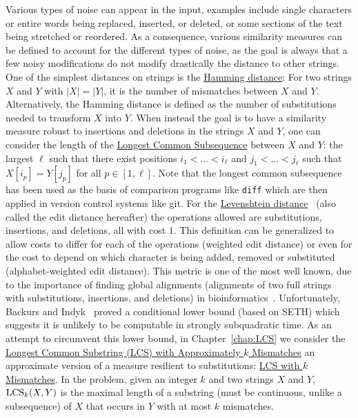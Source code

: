 Various types of noise can appear in the input, examples include single characters or entire words being replaced, inserted, or deleted, or some sections of the text being stretched or reordered. As a consequence, various similarity measures can be defined to account for the different types of noise, as the goal is always that a few noisy modifications do not modify drastically the distance to other strings.
One of the simplest distances on strings is the \underline{Hamming distance}: For two strings $X$ and $Y$ with $|X|=|Y|$, it is the number of mismatches between $X$ and $Y$. Alternatively, the Hamming distance is defined as the number of substitutions needed to transform $X$ into $Y$.
When instead the goal is to have a similarity measure robust to insertions and deletions in the strings $X$ and $Y$, one can consider the length of the \underline{Longest Common Subsequence} between $X$ and $Y$: the largest $\ell$ such that there exist positions $i_1<... < i_\ell$ and $j_1< ... < j_\ell$ such that $X[i_p] = Y[j_p]$ for all $p \in [1,\ell]$. Note that the longest common subsequence has been used as the basis of comparison programs like \texttt{diff} which are then applied in version control systems like git.
For the \underline{Levenshtein distance}~\cite{levenshtein1966binary} (also called the edit distance hereafter) the operations allowed are substitutions, insertions, and deletions, all with cost $1$. This definition can be generalized to allow costs to differ for each of the operations (weighted edit distance) or even for the cost to depend on which character is being added, removed or substituted (alphabet-weighted edit distance). This metric is one of the most well known, due to the importance of finding global alignments (alignments of two full strings with substitutions, insertions, and deletions) in bioinformatics~\cite{Gusfield1997}.
Unfortunately, Backurs and Indyk~\cite{DBLP:conf/stoc/BackursI15} proved a conditional lower bound (based on SETH) which suggests it is unlikely to be computable in strongly subquadratic time.
As an attempt to circumvent this lower bound, in Chapter~\ref{chap:LCS} we consider the \underline{Longest Common Substring (LCS) with Approximately $k$ Mismatches} an approximate version of a measure resilient to substitutions: \underline{LCS with $k$ Mismatches}. In the \kLCS problem, given an integer $k$ and two strings $X$ and $Y$, $\mathrm{LCS}_{k}(X,Y)$ is the maximal length of a substring (must be continuous, unlike a subsequence) of $X$ that occurs in $Y$ with at most $k$ mismatches. 
